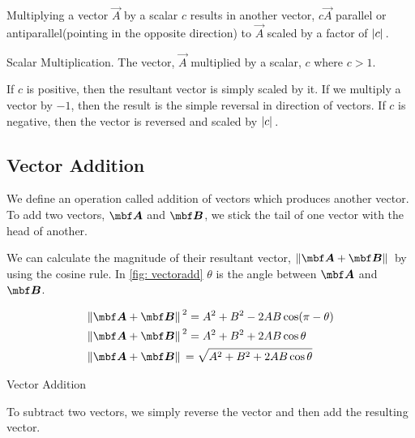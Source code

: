 Multiplying a vector \(\vec{A}\) by a scalar \(c\) results
in another vector, \(c\vec{A}\) parallel or antiparallel(pointing in the opposite 
direction) to \(\vec{A}\) scaled by a factor of \(\abs*{c}\).

\begin{marginfigure}
    \hspace{-5em}
    \vspace{-3em}
    \centering
    \caption{Scalar Multiplication. The vector, \(\vec{A}\) multiplied 
    by a scalar, \(c\) where \(c > 1\).}
\end{marginfigure}


If \(c\) is positive, then the resultant vector is simply scaled by it.
If we multiply a vector by \(-1\), then the result is the simple
reversal in direction of vectors. If \(c\) is negative, then the 
vector is reversed and scaled by \(\abs*{c}\). 


\subsection{Vector Addition}

We define an operation called addition of vectors which produces another vector.
To add two vectors, \(\Aa\) and \(\BB\), we stick the tail
of one vector with the head of another. 

We can calculate the magnitude of their resultant vector, \(\norm*{\Aa + \BB}\)
by using the cosine rule. In \cref{fig: vectoradd} \(\theta\) is the angle between 
\(\Aa\) and \(\BB\).

\begin{align*}
    &\norm*{\Aa + \BB}^2 = A^2 + B^2 - 2AB\cos(\pi - \theta) \\
    &\norm*{\Aa + \BB}^2 = A^2 + B^2 + 2AB\cos\theta \\
    &\norm*{\Aa + \BB} = \sqrt{A^2 + B^2 + 2AB\cos\theta}
\end{align*}
 
\begin{marginfigure}
    \caption{Vector Addition}
    \label{fig: vectoradd}
\end{marginfigure}

To subtract two vectors, we simply reverse the vector and then add the resulting vector.

